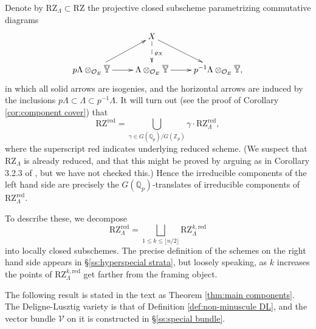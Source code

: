 \documentclass[11pt]{alggeom}
\newcommand{\red}{\mathrm{red}}
\newcommand{\Q}{\mathbb Q}
\newcommand{\Z}{\mathbb Z}
\newcommand{\co}{\mathcal O}
\begin{document}
Denote by  $\mathrm{RZ}_\Lambda \subset  \mathrm{RZ}$ the projective closed  subscheme parametrizing commutative diagrams 
\[
\xymatrix{
&{ X }\ar@{-->}[d]^{\varrho_X}  \ar[dr] \\
{ p\Lambda \otimes_{\co_E} \overline{\mathbb{Y}}}  \ar[r] \ar[ur] & { \Lambda \otimes_{\co_E} \overline{\mathbb{Y}}}   \ar[r] & { p^{-1}\Lambda \otimes_{\co_E}  \overline{\mathbb{Y}}} ,
}
\]
in which all solid arrows are isogenies, and the horizontal arrows are induced by the inclusions
$p\Lambda \subset \Lambda \subset p^{-1}\Lambda$.
It will turn out (see the proof of Corollary \ref{cor:component cover}) that
\[
\mathrm{RZ}^\red = \bigcup_{\gamma \in G(\Q_p) / G(\Z_p) } \gamma \cdot \mathrm{RZ}_\Lambda^\red,
\]
where the superscript $\red$ indicates underlying reduced scheme.
(We suspect that $\mathrm{RZ}_\Lambda$ is already reduced, and that this might be proved by arguing as in Corollary 3.2.3 of \cite{LZ}, but we have not checked this.) 
Hence the irreducible components of the left hand side are precisely the $G(\Q_p)$-translates of irreducible components of $\mathrm{RZ}_\Lambda^\red$.

To describe these, we decompose
\[
\mathrm{RZ}_\Lambda^\red = \bigsqcup_{1\le k \le \lfloor n/2 \rfloor} \mathrm{RZ}_\Lambda^{k,\red} 
\]
into locally closed subschemes.  The precise definition  of the schemes on the right hand side appears in \S \ref{ss:hyperspecial strata}, but 
loosely speaking, as $k$ increases the  points of $\mathrm{RZ}_\Lambda^{k,\red}$ get farther from the framing object.


 
The following result is stated in the text as Theorem \ref{thm:main components}.  
 The Deligne-Lusztig variety  is that of Definition  \ref{def:non-minuscule DL}, and the vector bundle $\mathscr{V}$ on it is constructed in \S \ref{ss:special bundle}. 
 
 
 
 
\end{document}
